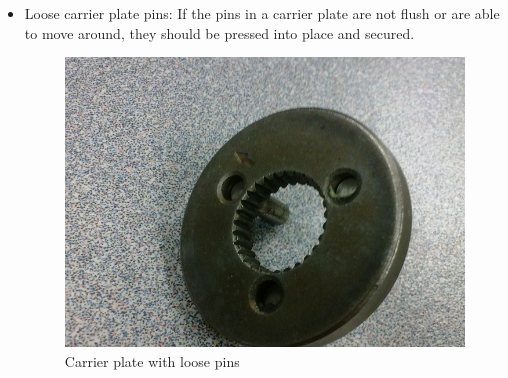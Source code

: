 \documentclass[12pt, letterpaper]{article}
\begin{document}
\begin{itemize}
    \item Loose carrier plate pins:
    \newline If the pins in a carrier plate are not flush or are able to move around, they should be pressed into place and secured.

    \begin{figure}[h!]
        \centering
        \includegraphics[scale = 0.35]{Carrier Plate.jpeg}
        \caption{Carrier plate with loose pins}
    \end{figure}


\end{itemize}

\end{document}

